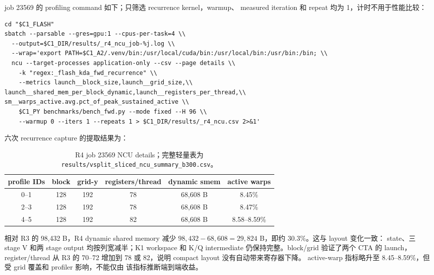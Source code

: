 \documentclass[11pt,a4paper,fontset=none]{ctexart}
\newcommand{\code}[1]{\texttt{#1}}
\begin{document}
job 23569 的 profiling command 如下；只筛选 recurrence kernel，warmup、
measured iteration 和 repeat 均为 1，计时不用于性能比较：

\begin{lstlisting}
cd "$C1_FLASH"
sbatch --parsable --gres=gpu:1 --cpus-per-task=4 \\
  --output=$C1_DIR/results/_r4_ncu_job-%j.log \\
  --wrap='export PATH=$C1_A2/.venv/bin:/usr/local/cuda/bin:/usr/local/bin:/usr/bin:/bin; \\
  ncu --target-processes application-only --csv --page details \\
    -k "regex:_flash_kda_fwd_recurrence" \\
    --metrics launch__block_size,launch__grid_size,\\
launch__shared_mem_per_block_dynamic,launch__registers_per_thread,\\
sm__warps_active.avg.pct_of_peak_sustained_active \\
    $C1_PY benchmarks/bench_fwd.py --mode fixed --H 96 \\
    --warmup 0 --iters 1 --repeats 1 > $C1_DIR/results/_r4_ncu.csv 2>&1'
\end{lstlisting}

六次 recurrence capture 的提取结果为：

\begin{table}[htbp]
\centering
\small
\begin{tabular}{c c c c c c}
\toprule
profile IDs & block & grid-y & registers/thread & dynamic smem & active warps \\
\midrule
0--1 & 128 & 192 & 78 & 68,608 B & 8.45\% \\
2--3 & 128 & 192 & 78 & 68,608 B & 8.47\% \\
4--5 & 128 & 192 & 82 & 68,608 B & 8.58--8.59\% \\
\bottomrule
\end{tabular}
\caption{R4 job 23569 NCU details；完整轻量表为
\code{results/vsplit\_sliced\_ncu\_summary\_b300.csv}。}
\end{table}

相对 R3 的 98,432 B，R4 dynamic shared memory 减少
\(98{,}432-68{,}608=29{,}824\) B，即约 \(30.3\%\)。这与 layout 变化一致：
state、三 stage V 和两 stage output 均按列宽减半；K1 workspace 和 K/Q
intermediate 仍保持完整。block/grid 验证了两个 CTA 的 launch，register/thread
从 R3 的 70--72 增加到 78 或 82，说明 compact layout 没有自动带来寄存器下降。
active-warp 指标略升至 8.45--8.59\%，但受 grid 覆盖和 profiler 影响，不能仅由
该指标推断端到端收益。
\end{document}
